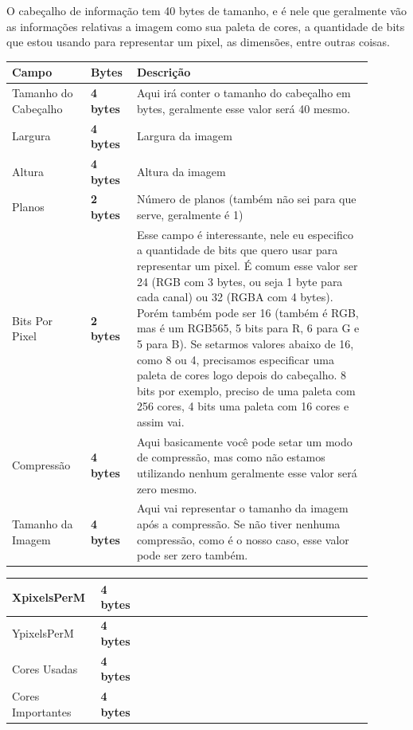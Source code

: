 \documentclass[a4paper,oneside,12pt]{article}
\begin{document}
O cabeçalho de informação tem 40 bytes de tamanho, e é nele que geralmente vão as informações relativas a imagem como sua paleta de cores, a quantidade de bits que estou usando para representar um pixel, as dimensões, entre outras coisas.
\begin{center}
\begin{tabular}{|p{0.2\linewidth}|p{0.1\linewidth}|p{0.6\linewidth}|}
    \hline
    \textbf{Campo} & \textbf{Bytes} & \textbf{Descrição} \\
    \hline
    Tamanho do Cabeçalho & \textbf{4 bytes} & Aqui irá conter o tamanho do cabeçalho em bytes, geralmente esse valor será 40 mesmo.\\
    \hline
    Largura & \textbf{4 bytes} & Largura da imagem\\
    \hline
    Altura & \textbf{4 bytes} & Altura da imagem\\
    \hline
    Planos & \textbf{2 bytes} & Número de planos (também não sei para que serve, geralmente é 1)\\
    \hline
    Bits Por Pixel & \textbf{2 bytes} & Esse campo é interessante, nele eu especifico a quantidade de bits que quero usar para representar um pixel. É comum esse valor ser 24 (RGB com 3 bytes, ou seja 1 byte para cada canal) ou 32 (RGBA com 4 bytes). Porém também pode ser 16 (também é RGB, mas é um RGB565, 5 bits para R, 6 para G e 5 para B). Se setarmos valores abaixo de 16, como 8 ou 4, precisamos especificar uma paleta de cores logo depois do cabeçalho. 8 bits por exemplo, preciso de uma paleta com 256 cores, 4 bits uma paleta com 16 cores e assim vai.\\
    \hline
    Compressão & \textbf{4 bytes} & Aqui basicamente você pode setar um modo de compressão, mas como não estamos utilizando nenhum geralmente esse valor será zero mesmo.\\
    \hline
    Tamanho da Imagem & \textbf{4 bytes} & Aqui vai representar o tamanho da imagem após a compressão. Se não tiver nenhuma compressão, como é o nosso caso, esse valor pode ser zero também.\\
    \hline
    
\end{tabular}
\end{center}

\begin{center}
\begin{tabular}{|p{0.2\linewidth}|p{0.1\linewidth}|p{0.6\linewidth}|}
    \hline
    XpixelsPerM & \textbf{4 bytes} & \\
    \hline
    YpixelsPerM & \textbf{4 bytes} & \\
    \hline
    Cores Usadas & \textbf{4 bytes} & \\
    \hline
    Cores Importantes & \textbf{4 bytes} & \\
    \hline
\end{tabular}
\end{center}
\end{document}
